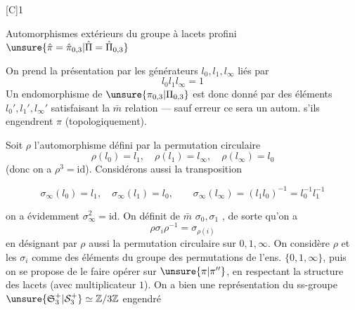 [C]\qquad\textcircled{1}\qquad{}

Automorphismes extérieurs du groupe à lacets  profini $\unsure{\hat\pi=\hat\pi_{0,3}|\hat\Pi=\hat\Pi_{0,3}}$
\margin{$\unsure{\partial|\delta}$}

On prend la présentation par les générateurs $l_0,l_1,l_\infty$ liés par
\[
l_0l_1l_\infty=1
\]
Un endomorphisme de $\unsure{\pi_{0,3}|\Pi_{0,3}}$ est donc donné par des éléments $l_0',l_1',l_\infty'$ satisfaisant la $\bar m$ relation --- sauf erreur ce sera un autom. s'ils engendrent $\pi$ (topologiquement).

Soit $\rho$ l'automorphisme défini par la permutation circulaire
\[
\rho(l_0)=l_1,\quad\rho(l_1)=l_\infty,\quad\rho(l_\infty)=l_0
\]
(donc on a $\rho^3=\mathrm{id}$). Considérons aussi la transposition

\[
\sigma_\infty(l_0)=l_1,\quad\sigma_\infty(l_1)=l_0,\qquad
\sigma_\infty(l_\infty)=(l_1l_0)^{-1}=l_0^{-1}l_1^{-1}
\]

on a évidemment $\sigma_\infty^2=\mathrm{id}$. On définit de $\bar m$ $\sigma_0,\sigma_1$ , de sorte qu'on a
\[
\rho\sigma_i\rho^{-1}=\sigma_{\rho(i)}
\]
en désignant par $\rho$ aussi la permutation circulaire sur $0,1,\infty$. On considère $\rho$ et les $\sigma_i$ comme des éléments du groupe  des permutations de l'ens. $\{0,1,\infty\}$, puis on se propose de le faire opérer sur $\unsure{\pi|\pi''}$, en respectant la structure des lacets (avec  multiplicateur $1$). On a bien une  représentation du ss-groupe $\unsure{\mathfrak S_3^+|\mathcal S_3^+}\simeq\mathbb Z/3\mathbb Z$ engendré
